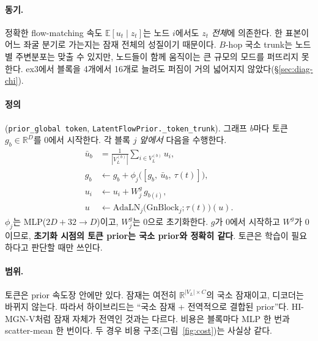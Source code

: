 \documentclass[11pt]{article}
\newcommand{\E}{\mathbb{E}}
\newcommand{\R}{\mathbb{R}}
\newcommand{\code}[1]{\texttt{#1}}
\begin{document}
\paragraph{동기.} 정확한 flow-matching 속도 $\E[u_t\mid z_t]$는 노드 $i$에서도
$z_t$ \emph{전체}에 의존한다. 한 표본이 어느 좌굴 분기로 가는지는 잠재 전체의
성질이기 때문이다. $B$-hop 국소 trunk는 노드별 주변분포는 맞출 수 있지만,
노드들이 함께 움직이는 큰 규모의 모드를 퍼뜨리지 못한다. ex3에서 블록을
4개에서 16개로 늘려도 퍼짐이 거의 넓어지지 않았다(\S\ref{sec:diag-chi}).

\paragraph{정의} (\code{prior\_global token}, \code{LatentFlowPrior.\_token\_trunk}).
그래프 $b$마다 토큰 $g_b\in\R^D$를 0에서 시작한다. 각 블록 $j$ \emph{앞에서}
다음을 수행한다.
\begin{align}
  \bar u_b &= \frac{1}{|V_L^{(b)}|}\sum_{i\in V_L^{(b)}} u_i, \\
  g_b &\leftarrow g_b + \phi_j\bigl([g_b,\ \bar u_b,\ \tau(t)]\bigr), \\
  u_i &\leftarrow u_i + W^{g}_j\, g_{b(i)}, \\
  u &\leftarrow \mathrm{AdaLN}_j\bigl(\mathrm{GnBlock}_j;\tau(t)\bigr)(u).
\end{align}
$\phi_j$는 MLP($2D+32\to D$)이고, $W^{g}_j$는 0으로 초기화한다. $g$가 0에서
시작하고 $W^{g}$가 0이므로, \textbf{초기화 시점의 토큰 prior는 국소 prior와
정확히 같다}. 토큰은 학습이 필요하다고 판단할 때만 쓰인다.

\paragraph{범위.} 토큰은 prior 속도장 안에만 있다. 잠재는 여전히
$\R^{|V_L|\times C}$의 국소 잠재이고, 디코더는 바뀌지 않는다. 따라서
하이브리드는 ``국소 잠재 + 전역적으로 결합된 prior''다. HI-MGN-V처럼 잠재
자체가 전역인 것과는 다르다. 비용은 블록마다 MLP 한 번과 scatter-mean 한
번이다. 두 경우 비용 구조(그림~\ref{fig:cost})는 사실상 같다.
\end{document}
